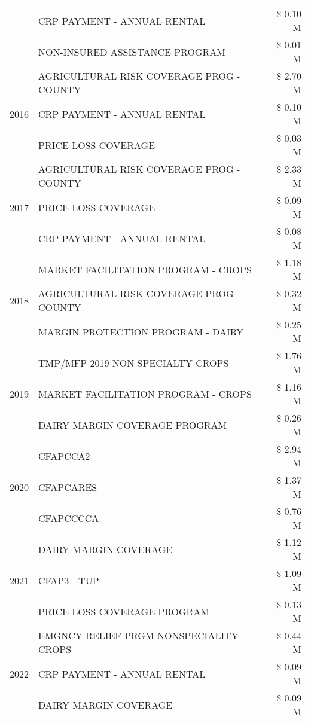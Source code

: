 \begin{tabular}{llr}
 & CRP PAYMENT - ANNUAL RENTAL & \$ 0.10 M \\
 & NON-INSURED ASSISTANCE PROGRAM & \$ 0.01 M \\
\cline{1-3}
\multirow[t]{3}{*}{2016} & AGRICULTURAL RISK COVERAGE PROG - COUNTY & \$ 2.70 M \\
 & CRP PAYMENT - ANNUAL RENTAL & \$ 0.10 M \\
 & PRICE LOSS COVERAGE & \$ 0.03 M \\
\cline{1-3}
\multirow[t]{3}{*}{2017} & AGRICULTURAL RISK COVERAGE PROG - COUNTY & \$ 2.33 M \\
 & PRICE LOSS COVERAGE & \$ 0.09 M \\
 & CRP PAYMENT - ANNUAL RENTAL & \$ 0.08 M \\
\cline{1-3}
\multirow[t]{3}{*}{2018} & MARKET FACILITATION PROGRAM - CROPS & \$ 1.18 M \\
 & AGRICULTURAL RISK COVERAGE PROG - COUNTY & \$ 0.32 M \\
 & MARGIN PROTECTION PROGRAM - DAIRY & \$ 0.25 M \\
\cline{1-3}
\multirow[t]{3}{*}{2019} & TMP/MFP 2019 NON SPECIALTY CROPS & \$ 1.76 M \\
 & MARKET FACILITATION PROGRAM - CROPS & \$ 1.16 M \\
 & DAIRY MARGIN COVERAGE PROGRAM & \$ 0.26 M \\
\cline{1-3}
\multirow[t]{3}{*}{2020} & CFAPCCA2 & \$ 2.94 M \\
 & CFAPCARES & \$ 1.37 M \\
 & CFAPCCCCA & \$ 0.76 M \\
\cline{1-3}
\multirow[t]{3}{*}{2021} & DAIRY MARGIN COVERAGE & \$ 1.12 M \\
 & CFAP3 - TUP & \$ 1.09 M \\
 & PRICE LOSS COVERAGE PROGRAM & \$ 0.13 M \\
\cline{1-3}
\multirow[t]{3}{*}{2022} & EMGNCY RELIEF PRGM-NONSPECIALITY CROPS & \$ 0.44 M \\
 & CRP PAYMENT - ANNUAL RENTAL & \$ 0.09 M \\
 & DAIRY MARGIN COVERAGE & \$ 0.09 M \\
\cline{1-3}
\bottomrule
\end{tabular}
